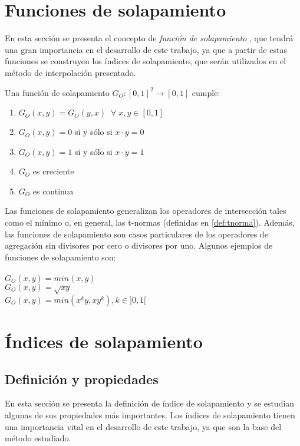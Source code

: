 \section{Funciones de solapamiento}\label{sec:overlap-functions}
En esta sección se presenta el concepto de \emph{función de solapamiento} \cite{bustince2010overlapfunctions,bustince2012pairwisecomparisons,jurio2013propertiesoverlap}, que tendrá una gran importancia en el desarrollo de este trabajo, ya que a partir de estas funciones se construyen los índices de solapamiento, que serán utilizados en el método de interpolación presentado.
\begin{definition}
Una función de solapamiento $G_{O} : [0,1]^{2} \rightarrow [0,1]$ cumple:
\begin{enumerate}[label=(G\arabic*),ref=(G\arabic*)]
   \item $G_{O}(x,y) = G_{O}(y,x) \;\; \forall \; x,y \in [0,1]$ \label{G1}
   \item $G_{O}(x,y) = 0$ si y sólo si $x \cdot y = 0$ \label{G2}
   \item $G_{O}(x,y) = 1$ si y sólo si $x \cdot y = 1$ \label{G3}
   \item $G_{O}$ es creciente \label{G4}
   \item $G_{O}$ es continua \label{G5}
\end{enumerate}
\end{definition}
Las funciones de solapamiento generalizan los operadores de intersección tales como el mínimo o, en general, las t-normas (definidas en \ref{def:tnorma}). Además, las funciones de solapamiento son casos particulares de los operadores de agregación sin divisores por cero o divisores por uno. Algunos ejemplos de funciones de solapamiento son:\\
\\
$G_{O}(x,y) = min(x,y)$\\
$G_{O}(x,y) = \sqrt{xy}$\\
$G_{O}(x,y) = min(x^{k}y,xy^{k}), k \in ]0,1[$\\

\section{Índices de solapamiento}
\subsection{Definición y propiedades}
En esta sección se presenta la definición de índice de solapamiento y se estudian algunas de sus propiedades más importantes. Los índices de solapamiento tienen una importancia vital en el desarrollo de este trabajo, ya que son la base del método estudiado. 


